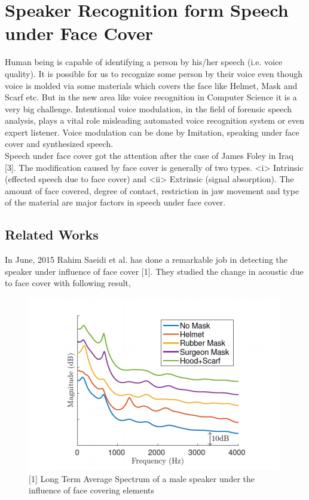 \documentclass[12pt]{scrartcl}
\begin{document}
\pagebreak

\section{Speaker Recognition form Speech under Face Cover}
Human being is capable of identifying a person by his/her speech (i.e. voice
quality). It is possible for us to recognize some person by their voice even though voice
is molded via some materials which covers the face like Helmet, Mask and Scarf etc.
But in the new area like voice recognition in Computer Science it is a very big
challenge. Intentional voice modulation, in the field of forensic speech analysis, plays a
vital role misleading automated voice recognition system or even expert listener.
Voice modulation can be done by Imitation, speaking under face cover and
synthesized speech.\\

Speech under face cover got the attention after the case of James Foley in Iraq [3].
The modification caused by face cover is generally of two types. <i> Intrinsic (effected
speech due to face cover) and <ii> Extrinsic (signal absorption). The amount of face
covered, degree of contact, restriction in jaw movement and type of the material are
major factors in speech under face cover.
\subsection{Related Works}
In June, 2015 Rahim Saeidi et al. has done a remarkable job in detecting the
speaker under influence of face cover [1]. They studied the change in acoustic due to
face cover with following result,
\begin{figure}[h]
	\centering
	\includegraphics[scale=1]{4.png}
	\caption{[1] Long Term Average Spectrum of a male speaker
 			under the influence of face covering elements}
 	\label{four}
\end{figure}
\end{document}
